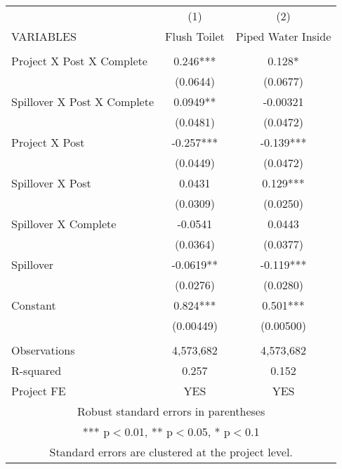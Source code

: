 \begin{tabular}{lcc} \hline
 & (1) & (2) \\
VARIABLES & Flush Toilet & Piped Water Inside \\ \hline
 &  &  \\
Project X Post X Complete & 0.246*** & 0.128* \\
 & (0.0644) & (0.0677) \\
Spillover X Post X Complete & 0.0949** & -0.00321 \\
 & (0.0481) & (0.0472) \\
Project X Post & -0.257*** & -0.139*** \\
 & (0.0449) & (0.0472) \\
Spillover X Post & 0.0431 & 0.129*** \\
 & (0.0309) & (0.0250) \\
Spillover X Complete & -0.0541 & 0.0443 \\
 & (0.0364) & (0.0377) \\
Spillover & -0.0619** & -0.119*** \\
 & (0.0276) & (0.0280) \\
Constant & 0.824*** & 0.501*** \\
 & (0.00449) & (0.00500) \\
 &  &  \\
Observations & 4,573,682 & 4,573,682 \\
R-squared & 0.257 & 0.152 \\
 Project FE & YES & YES \\ \hline
\multicolumn{3}{c}{ Robust standard errors in parentheses} \\
\multicolumn{3}{c}{ *** p$<$0.01, ** p$<$0.05, * p$<$0.1} \\
\multicolumn{3}{c}{ Standard errors are clustered at the project level.} \\
\end{tabular}
